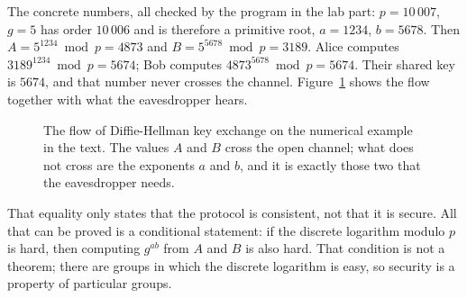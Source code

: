 The concrete numbers, all checked by the program in the lab part: $p=10\,007$, $g=5$ has order
$10\,006$ and is therefore a primitive root, $a=1234$, $b=5678$. Then $A=5^{1234}\bmod p=4873$ and
$B=5^{5678}\bmod p=3189$. Alice computes $3189^{1234}\bmod p=5674$; Bob computes
$4873^{5678}\bmod p=5674$. Their shared key is $5674$, and that number never crosses the channel.
Figure~\ref{fig:dh} shows the flow together with what the eavesdropper hears.

\begin{figure}[htbp]
\centering
{}
\caption{The flow of Diffie-Hellman key exchange on the numerical example in the text. The values $A$
and $B$ cross the open channel; what does not cross are the exponents $a$ and $b$, and it is exactly
those two that the eavesdropper needs.}
\label{fig:dh}
\end{figure}

That equality only states that the protocol is consistent, not that it is secure. All that can be
proved is a conditional statement: if the discrete logarithm modulo $p$ is hard, then computing
$g^{ab}$ from $A$ and $B$ is also hard. That condition is not a theorem; there are groups in which
the discrete logarithm is easy, so security is a property of particular groups.


